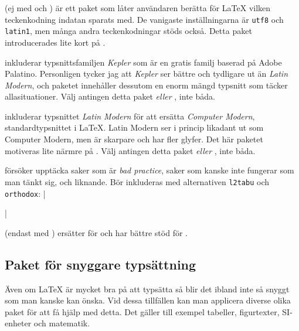 \documentclass[10pt,../../a4.tex]{subfiles}
\begin{document}
\begin{description}
	\item[\pack{inputenx}] (ej med \XeTeX och )
	är ett paket som låter användaren berätta för \LaTeX{} vilken
	teckenkodning indatan sparats med. De vanigaste inställningarna är
	\texttt{utf8} och \texttt{latin1}, men många andra teckenkodningar
	stöds också.
	Detta paket introducerades lite kort på .

	\item[\pack{kpfonts}]
	inkluderar typsnittsfamiljen \emph{Kepler} som är en gratis familj
	baserad på Adobe Palatino. Personligen tycker jag att \emph{Kepler}
	ser bättre och tydligare ut än \emph{Latin Modern}, och paketet
	innehåller dessutom en enorm mängd typsnitt som täcker allasituationer.
	Välj antingen detta paket \emph{eller} , inte båda.
	
	\item[\pack{lmodern}]
	inkluderar typsnittet \emph{Latin Modern} för att ersätta
	\emph{Computer Modern}, standardtypsnittet i \LaTeX. Latin Modern ser
	i princip likadant ut som Computer Modern, men är skarpare och har
	fler glyfer. Det här paketet motiveras lite närmre på 
	. Välj antingen detta paket \emph{eller}
	, inte båda.
	
	\item[{\pack{nag}}]
	försöker upptäcka saker som är \emph{bad practice}, saker som kanske
	inte fungerar som man tänkt sig, och liknande. Bör inkluderas med
	alternativen \texttt{l2tabu} och \texttt{orthodox}:
	\latex|\usepackage[l2tabu,orthodox]{nag}|

	\item[{\pack{polyglossia}}] (endast med \XeTeX)
	ersätter  för \XeTeX och har bättre stöd för \UTF.
\end{description}

\subsection{Paket för snyggare typsättning}
Även om \LaTeX{} är mycket bra på att typsätta så blir det ibland inte
så snyggt som man kanske kan önska. Vid dessa tillfällen kan man
applicera diverse olika paket för att få hjälp med detta. Det gäller
till exempel tabeller, figurtexter, SI-enheter och matematik.
\end{document}
